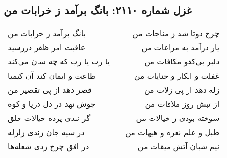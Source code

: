 \begin{center}
\section*{غزل شماره ۲۱۱۰: بانگ برآمد ز خرابات من}
\label{sec:2110}
\begin{longtable}{l p{0.5cm} r}
بانگ برآمد ز خرابات من
&&
چرخ دوتا شد ز مناجات من
\\
عاقبت امر ظفر دررسید
&&
یار درآمد به مراعات من
\\
یا رب یا رب که چه سان می‌کند
&&
دلبر بی‌کفو مکافات من
\\
طاعت و ایمان کند آن کیمیا
&&
غفلت و انکار و جنایات من
\\
قصر دهد از پی تقصیر من
&&
زله دهد از پی زلات من
\\
جوش نهد در دل دریا و کوه
&&
از تبش روز ملاقات من
\\
گر نبدی پرده خیالات خلق
&&
سوخته بودی ز خیالات من
\\
در سپه جان زندی زلزله
&&
طبل و علم نعره و هیهات من
\\
در افق چرخ زدی شعله‌ها
&&
نیم شبان آتش میقات من
\\
\end{longtable}
\end{center}
